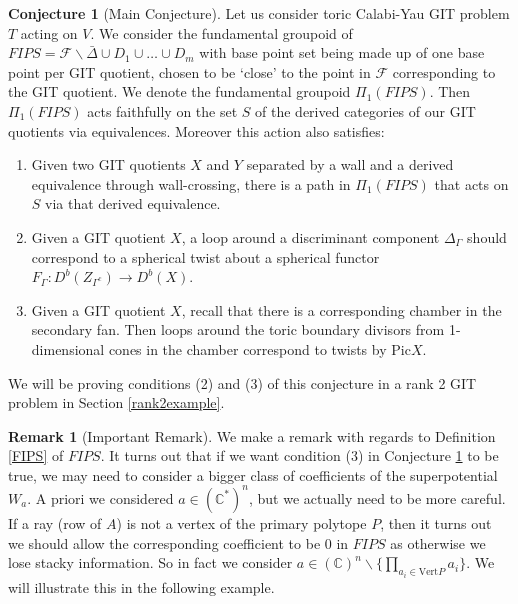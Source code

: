 \documentclass[oneside,reqno]{amsart}
\theoremstyle{definition}
\theoremstyle{definition}
\newtheorem{conjecture}{Conjecture}[section]
\theoremstyle{definition}
\theoremstyle{definition}
\newtheorem{remark}{Remark} [section]
\newcommand{\CC}{\mathbb{C}}
\newcommand{\Fs}{\mathcal{F}}
\begin{document}
\begin{conjecture}[Main Conjecture]
    \label{main}
    Let us consider toric Calabi-Yau GIT problem $T$ acting on $V$. We consider the fundamental groupoid of $FIPS= \Fs \backslash \bar{\Delta} \cup D_1 \cup \dots \cup D_m$ with base point set being made up of one base point per GIT quotient, chosen to be `close' to the point in $\Fs$ corresponding to the GIT quotient. We denote the fundamental groupoid $\Pi_1(FIPS)$. Then $\Pi_1(FIPS)$ acts faithfully on the set $S$ of the derived categories of our GIT quotients via equivalences. Moreover this action also satisfies:
    \begin{enumerate}
        \item Given two GIT quotients $X$ and $Y$ separated by a wall and a derived equivalence through wall-crossing, there is a path in $\Pi_1(FIPS)$ that acts on $S$ via that derived equivalence.
        \item Given a GIT quotient $X$, a loop around a discriminant component $\Delta_\Gamma$ should correspond to a spherical twist about a spherical functor $F_{\Gamma} : D^b(Z_{\Gamma^c}) \to D^b(X)$.
        \item Given a GIT quotient $X$, recall that there is a corresponding chamber in the secondary fan. Then loops around the toric boundary divisors from 1-dimensional cones in the chamber correspond to twists by $\text{Pic} X$.
    \end{enumerate}
\end{conjecture}
We will be proving conditions (2) and (3) of this conjecture in a rank 2 GIT problem in Section \ref{rank2example}.
\begin{remark}[Important Remark]
\label{stacky}
We make a remark with regards to Definition \ref{FIPS} of $FIPS$. It turns out that if we want condition (3) in Conjecture \ref{main} to be true, we may need to consider a bigger class of coefficients of the superpotential $W_a$. A priori we considered $a \in (\CC^*)^{n}$, but we actually need to be more careful. If a ray (row of $A$) is not a vertex of the primary polytope $P$, then it turns out we should allow the corresponding coefficient to be 0 in $FIPS$ as otherwise we lose stacky information. So in fact we consider $a \in (\CC)^{n} \backslash \{ \prod_{a_i\in \text{Vert}P} a_i \}$. We will illustrate this in the following example.
\end{remark}
\end{document}
